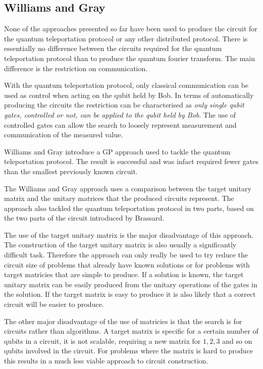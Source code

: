 \subsection{Williams and Gray}
None of the approaches presented so far have been used to produce the circuit for the quantum teleportation protocol or any other distributed protocol.
There is essentially no difference between the circuits required for the quantum teleportation protocol than to produce the quantum fourier transform.
The main difference is the restriction on communication.

With the quantum teleportation protocol, only classical communication can be used as control when acting on the qubit held by Bob.
In terms of automatically producing the circuits the restriction can be characterised as \emph{only single qubit gates, controlled or not, can be applied to the qubit held by Bob}.
The use of controlled gates can allow the search to loosely represent measurement and communication of the measured value.

Williams and Gray\cite{Williams:1998:ADQ:645812.670824} introduce a GP approach used to tackle the quantum teleportation protocol.
The result is successful and was infact required fewer gates than the smallest previously known circuit.

The Williams and Gray approach uses a comparison between the target unitary matrix and the unitary matrices that the produced circuits represent.
The approach also tackled the quantum teleportation protocol in two parts, based on the two parts of the circuit introduced by Brassard\cite{1998PhyDBrassard}.

The use of the target unitary matrix is the major disadvantage of this approach.
The construction of the target unitary matrix is also usually a significantly difficult task.
Therefore the approach can only really be used to try reduce the circuit size of problems that already have known solutions or for problems with target matricies that are simple to produce.
If a solution is known, the target unitary matrix can be easily produced from the unitary operations of the gates in the solution.
If the target matrix is easy to produce it is also likely that a correct circuit will be easier to produce.

The other major disadvantage of the use of matricies is that the search is for circuits rather than algorithms.
A target matrix is specific for a certain number of qubits in a circuit, it is not scalable, requiring a new matrix for $1, 2, 3$ and so on qubits involved in the circuit.
For problems where the matrix is hard to produce this results in a much less viable approach to circuit construction.

